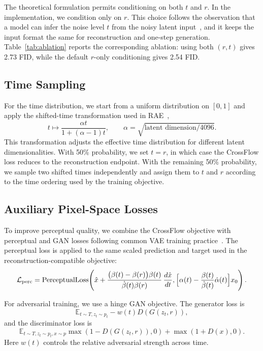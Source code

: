 The theoretical formulation permits conditioning on both $t$ and $r$. In the implementation, we condition only on $r$. This choice follows the observation that a model can infer the noise level $t$ from the noisy latent input~\citep{DiffNoTime}, and it keeps the input format the same for reconstruction and one-step generation. Table~\ref{tab:ablation} reports the corresponding ablation: using both $(r,t)$ gives 2.73 FID, while the default $r$-only conditioning gives 2.54 FID.


\subsection{Time Sampling}

For the time distribution, we start from a uniform distribution on $[0,1]$ and apply the shifted-time transformation used in RAE~\citep{RAE},
\begin{equation}
    t \mapsto \frac{\alpha t}{1 + (\alpha - 1)t},
    \qquad
    \alpha = \sqrt{\text{latent dimension}/4096}.
\end{equation}
This transformation adjusts the effective time distribution for different latent dimensionalities. With 50\% probability, we set $t=r$, in which case the CrossFlow loss reduces to the reconstruction endpoint. With the remaining 50\% probability, we sample two shifted times independently and assign them to $t$ and $r$ according to the time ordering used by the training objective.

\subsection{Auxiliary Pixel-Space Losses}

To improve perceptual quality, we combine the CrossFlow objective with perceptual and GAN losses following common VAE training practice~\citep{vqgan}. The perceptual loss is applied to the same scaled prediction and target used in the reconstruction-compatible objective:
\begin{equation}
\mathcal{L}_{\mathrm{perc}} =
\mathrm{PerceptualLoss}\!\left(
\hat{x} + \frac{\bigl(\beta(t)-\beta(r)\bigr)\beta(t)}{\dot{\beta}(t)\beta(r)}\,
\frac{d\hat{x}}{dt},
\Bigl[ \alpha(t) - \frac{\beta(t)}{\dot{\beta}(t)}\dot{\alpha}(t) \Bigr] x_0
\right).
\end{equation}

For adversarial training, we use a hinge GAN objective. The generator loss is
\begin{equation}
    \mathbb E_{t\sim T, z_t\sim p_t} -w(t)D(G(z_t, r)),
\end{equation}
and the discriminator loss is
\begin{equation}
    \mathbb E_{t\sim T, z_t\sim p_t, x\sim p}
    \max(1 - D(G(z_t, r)), 0) + \max(1 + D(x), 0).
\end{equation}
Here $w(t)$ controls the relative adversarial strength across time.

